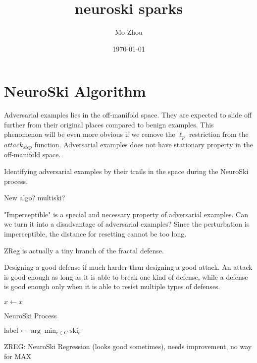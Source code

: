 \documentclass[twocolumn]{article}
\title{neuroski sparks}
\author{Mo Zhou}
\date{\today}
\begin{document}
\maketitle
\tableofcontents
	
\section{NeuroSki Algorithm}

Adversarial examples lies in the off-manifold space. They
are expected to slide off further from their original places
compared to benign examples. This phenomenon will be even
more obvious if we remove the $\ell_p$ restriction from the
$attack_{step}$ function. Adversarial examples does not have
stationary property in the off-manifold space.

Identifying adversarial examples by their trails in the space
during the NeuroSki process.

New algo? multiski?

"Imperceptible" is a special and necessary property of
adversarial examples. Can we turn it into a disadvantage
of adversarial examples? Since the perturbation is imperceptible,
the distance for resetting cannot be too long.

ZReg is actually a tiny branch of the fractal defense.

Designing a good defense if much harder than designing a good attack.
An attack is good enough as long as it is able to break one kind of defense,
while a defense is good enough only when it is able to resist multiple types
of defenses.

\begin{algorithm}
	\SetAlgoLined
	$\hat{x} \gets x$\;
	\caption{NeuroSki Process}
	\label{algo:neuroski}
\end{algorithm}

\begin{algorithm}
	\SetAlgoLined	
	$\text{label} \leftarrow \arg\min_{c\in C} \text{ski}_c$\;
	\caption{ZREG: NeuroSki Regression (looks good sometimes), needs
	improvement, no way for MAX}
	\label{algo:nsreg}
\end{algorithm}
\end{document}
